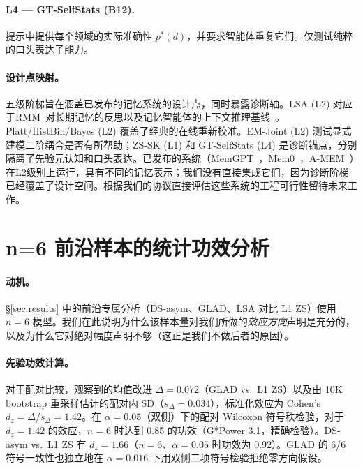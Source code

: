 \documentclass[11pt,a4paper,fontset=fandol]{ctexart}
\begin{document}
\paragraph{L4 --- GT-SelfStats (B12).} 提示中提供每个领域的实际准确性 $p^*(d)$，并要求智能体重复它们。仅测试纯粹的口头表达子能力。

\paragraph{设计点映射。} 五级阶梯旨在涵盖已发布的记忆系统的设计点，同时暴露诊断轴。LSA (L2) 对应于RMM~\citep{tan2025rmm}对长期记忆的反思以及记忆智能体的上下文推理基线~\citep{hu2026memoryagent}。Platt/HistBin/Bayes (L2) 覆盖了经典的在线重新校准。EM-Joint (L2) 测试显式建模二阶耦合是否有所帮助；ZS-SK (L1) 和 GT-SelfStats (L4) 是诊断锚点，分别隔离了先验元认知和口头表达。已发布的系统（MemGPT~\citep{packer2023memgpt}，Mem0~\citep{mem02025}，A-MEM~\citep{xu2025amem}）在L2级别上运行，具有不同的记忆表示；我们没有直接集成它们，因为诊断阶梯已经覆盖了设计空间。根据我们的协议直接评估这些系统的工程可行性留待未来工作。

\section{n=6 前沿样本的统计功效分析}
\label{app:power}

\paragraph{动机。} \S\ref{sec:results} 中的前沿专属分析（DS-asym、GLAD、LSA 对比 L1 ZS）使用 $n=6$ 模型。我们在此说明为什么该样本量对我们所做的\emph{效应方向}声明是充分的，以及为什么它对绝对幅度声明不够（这正是我们不做后者的原因）。

\paragraph{先验功效计算。} 对于配对比较，观察到的均值改进 $\Delta = 0.072$（GLAD vs.\ L1 ZS）以及由 10K bootstrap 重采样估计的配对内 SD（$s_\Delta = 0.034$），标准化效应为 Cohen's $d_z = \Delta / s_\Delta = 1.42$。在 $\alpha=0.05$（双侧）下的配对 Wilcoxon 符号秩检验，对于 $d_z = 1.42$ 的效应，$n=6$ 时达到 0.85 的功效（G*Power 3.1，精确检验）。DS-asym vs.\ L1 ZS 有 $d_z = 1.66$（$n=6$、$\alpha=0.05$ 时功效为 0.92）。GLAD 的 6/6 符号一致性也独立地在 $\alpha=0.016$ 下用双侧二项符号检验拒绝零方向假设。
\end{document}
